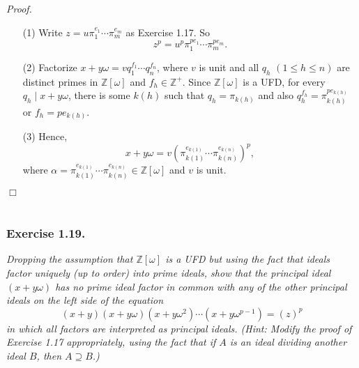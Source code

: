 \documentclass{article}
\begin{document}
\emph{Proof.}
\begin{enumerate}
\item[(1)]
Write $z = u {\pi}_1^{e_1} \cdots {\pi}_m^{e_m}$ as Exercise 1.17.
So
$$z^p = u^p {\pi}_1^{pe_1} \cdots {\pi}_m^{pe_m}.$$
\item[(2)]
Factorize $x + y\omega = v q_1^{f_1} \cdots q_n^{f_n}$,
where $v$ is unit and all $q_h$ $(1 \leq h \leq n)$ are distinct primes in $\mathbb{Z}[\omega]$
and $f_h \in \mathbb{Z}^+$.
Since $\mathbb{Z}[\omega]$ is a UFD,
for every $q_h \mid x + y\omega$, there is some $k(h)$ such that $q_h = \pi_{k(h)}$
and also $q_h^{f_h} = \pi_{k(h)}^{pe_{k(h)}}$ or $f_h = pe_{k(h)}$.
\item[(3)]
Hence,
$$x + y\omega = v \left( \pi_{k(1)}^{e_{k(1)}} \cdots \pi_{k(n)}^{e_{k(n)}} \right)^p,$$
where $\alpha = \pi_{k(1)}^{e_{k(1)}} \cdots \pi_{k(n)}^{e_{k(n)}} \in \mathbb{Z}[\omega]$
and $v$ is unit.
\end{enumerate}
$\Box$ \\\\






\subsubsection*{Exercise 1.19.}
\emph{Dropping the assumption that $\mathbb{Z}[\omega]$ is a UFD but
using the fact that ideals factor uniquely (up to order) into prime ideals,
show that the principal ideal $(x+y\omega)$ has no prime ideal factor in common with
any of the other principal ideals on the left side of the equation
$$(x+y)(x+y\omega)(x+y\omega^2) \cdots (x+y\omega^{p-1}) = (z)^p$$
in which all factors are interpreted as principal ideals.
(Hint: Modify the proof of Exercise 1.17 appropriately,
using the fact that if $A$ is an ideal dividing another ideal $B$,
then $A \supseteq B$.)} \\
\end{document}
